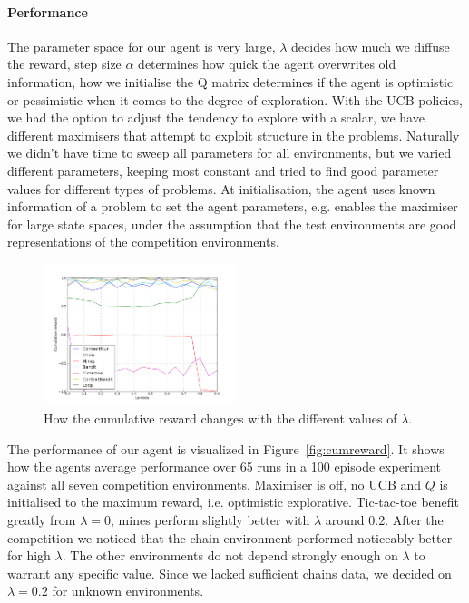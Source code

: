 \paragraph{Performance}
The parameter space for our agent is very large, $\lambda$ decides how much we
diffuse the reward, step size $\alpha$ determines how quick the agent overwrites
old information, how we initialise the Q matrix determines if the agent is
optimistic or pessimistic when it comes to the degree of exploration. With the
UCB policies, we had the option to adjust the tendency to explore with a scalar,
we have different maximisers that attempt to exploit structure in the problems.
Naturally we didn't have time to sweep all parameters for all environments, but
we varied different parameters, keeping most constant and tried to find good
parameter values for different types of problems. At initialisation, the agent
uses known information of a problem to set the agent parameters, e.g. enables
the maximiser for large state spaces, under the assumption that the test
environments are good representations of the competition environments.

\begin{figure}[h]
    \centering
    \includegraphics[width=0.5\textwidth]{../data/lambdasweepplot.png}
    \caption{How the cumulative reward changes with the different values of $\lambda$.}
    \label{fig:lambdasweep}
\end{figure}
The performance of our agent is visualized in Figure~\ref{fig:cumreward}. It shows how the agents average performance over 65 runs
in a 100 episode experiment against all seven competition environments.
Maximiser is off, no UCB and $Q$ is initialised to the maximum reward, i.e. optimistic
explorative. Tic-tac-toe benefit greatly from $\lambda= 0$, mines perform
slightly better with $\lambda$ around 0.2. After the competition we noticed that
the chain environment performed noticeably better for high $\lambda$. The other
environments do not depend strongly enough on $\lambda$ to warrant any specific value. Since we lacked sufficient chains data, we decided on $\lambda = 0.2$ for unknown environments.

